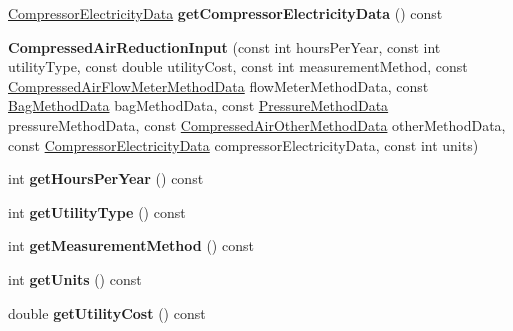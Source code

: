 \begin{DoxyCompactItemize}
\item 
\mbox{\label{class_compressed_air_reduction_input_a17e939dbbe29dc285967a0e34cb4b113}} 
\hyperlink{class_compressor_electricity_data}{Compressor\+Electricity\+Data} {\bfseries get\+Compressor\+Electricity\+Data} () const
\item 
\mbox{\label{class_compressed_air_reduction_input_ab77e29031a9683a8842612ac55868bf0}} 
{\bfseries Compressed\+Air\+Reduction\+Input} (const int hours\+Per\+Year, const int utility\+Type, const double utility\+Cost, const int measurement\+Method, const \hyperlink{class_compressed_air_flow_meter_method_data}{Compressed\+Air\+Flow\+Meter\+Method\+Data} flow\+Meter\+Method\+Data, const \hyperlink{class_bag_method_data}{Bag\+Method\+Data} bag\+Method\+Data, const \hyperlink{class_pressure_method_data}{Pressure\+Method\+Data} pressure\+Method\+Data, const \hyperlink{class_compressed_air_other_method_data}{Compressed\+Air\+Other\+Method\+Data} other\+Method\+Data, const \hyperlink{class_compressor_electricity_data}{Compressor\+Electricity\+Data} compressor\+Electricity\+Data, const int units)
\item 
\mbox{\label{class_compressed_air_reduction_input_a7081f6958226f9e63330c5238a8d8e2b}} 
int {\bfseries get\+Hours\+Per\+Year} () const
\item 
\mbox{\label{class_compressed_air_reduction_input_a94e2975b61c875643a3b3b6d5eb3112b}} 
int {\bfseries get\+Utility\+Type} () const
\item 
\mbox{\label{class_compressed_air_reduction_input_a88e82bcb0399fb29044e77f11384f439}} 
int {\bfseries get\+Measurement\+Method} () const
\item 
\mbox{\label{class_compressed_air_reduction_input_ab4368f51ab9bc08a80dae0e9727da3fb}} 
int {\bfseries get\+Units} () const
\item 
\mbox{\label{class_compressed_air_reduction_input_a53503e7e8b40c79144100e7e23a029d1}} 
double {\bfseries get\+Utility\+Cost} () const
\item 

\end{DoxyCompactItemize}
